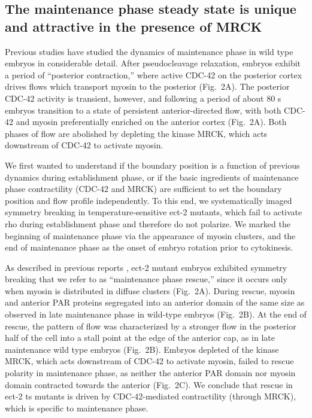 \documentclass[11pt]{article}
\newcommand{\6}[1]{#1_{\text{6}}}
\newcommand{\3}[1]{#1_{\text{3}}}
\begin{document}
\subsection*{The maintenance phase steady state is unique and attractive in the presence of MRCK}
Previous studies \cite{sailer2015dynamic} have studied the dynamics of maintenance phase in wild type embryos in considerable detail. After pseudocleavage relaxation, embryos exhibit a period of ``posterior contraction,'' where active CDC-42 on the posterior cortex drives flows which transport myosin to the posterior (Fig.\ 2A). The posterior CDC-42 activity is transient, however, and following a period of about 80 s embryos transition to a state of persistent anterior-directed flow, with both CDC-42 and myosin preferentially enriched on the anterior cortex (Fig.\ 2A). Both phases of flow are abolished by depleting the kinase MRCK, which acts downstream of CDC-42 to activate myosin.

We first wanted to understand if the boundary position is a function of previous dynamics during establishment phase, or if the basic ingredients of maintenance phase contractility (CDC-42 and MRCK) are sufficient to set the boundary position and flow profile independently. To this end, we systematically imaged symmetry breaking in temperature-sensitive ect-2 mutants, which fail to activate rho during establishment phase and therefore do not polarize. We marked the beginning of maintenance phase via the appearance of myosin clusters, and the end of maintenance phase as the onset of embryo rotation prior to cytokinesis. 

As described in previous reports \citep{zonies2010symmetry}, ect-2 mutant embryos exhibited symmetry breaking that we refer to as ``maintenance phase rescue,'' since it occurs only when myosin is distributed in diffuse clusters (Fig.\ 2A). During rescue, myosin and anterior PAR proteins segregated into an anterior domain of the same size as observed in late maintenance phase in wild-type embryos (Fig.\ 2B). At the end of rescue, the pattern of flow was characterized by a stronger flow in the posterior half of the cell into a stall point at the edge of the anterior cap, as in late maintenance wild type embryos (Fig.\ 2B). Embryos depleted of the kinase MRCK, which acts downstream of CDC-42 to activate myosin, failed to rescue polarity in maintenance phase, as neither the anterior PAR domain nor myosin domain contracted towards the anterior (Fig.\ 2C). We conclude that rescue in ect-2 ts mutants is driven by CDC-42-mediated contractility (through MRCK), which is specific to maintenance phase.
\end{document}
